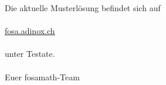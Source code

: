 \documentclass[a4paper,10pt,fleqn]{book}
\begin{document}
\Huge
\vfill
\noindent
Die aktuelle Musterlösung befindet sich auf \\\\
\url{fosa.adinox.ch} \\\\
unter Testate. \\\\
\Large
Euer fosamath-Team


%
%
%
%
%
%
%
%
\end{document}
